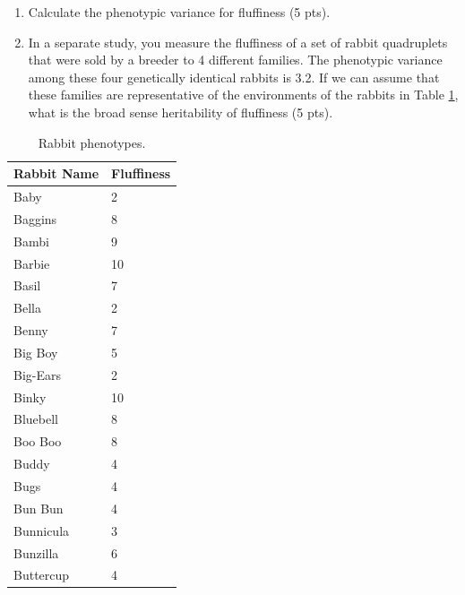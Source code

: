 \documentclass[]{article}
\begin{document}
\begin{enumerate}
\begin{enumerate}
\item Calculate the phenotypic variance for fluffiness (5 pts).
\item In a separate study, you measure the fluffiness of a set of rabbit quadruplets that were sold by a breeder to 4 different families.  The phenotypic variance among these four genetically identical rabbits is 3.2. If we can assume that these families are representative of the environments of the rabbits in Table \ref{fluffy}, what is the broad sense heritability of fluffiness (5 pts).

\end{enumerate}

\begin{table}[h!]
\caption[]{Rabbit phenotypes.}
\begin{center}
\begin{tabular}{ll}
Rabbit Name & Fluffiness \\  \hline
Baby & 2\\
Baggins & 8\\
Bambi & 9\\
Barbie & 10\\
Basil & 7\\
Bella & 2\\
Benny & 7\\
Big Boy & 5\\
Big-Ears & 2\\
Binky & 10\\
Bluebell & 8\\
Boo Boo & 8\\
Buddy & 4\\
Bugs & 4\\
Bun Bun & 4\\
Bunnicula & 3\\
Bunzilla & 6\\
Buttercup & 4\\
\end{tabular}
\end{center}
\label{fluffy}
\end{table}



\end{enumerate}
\end{document}
